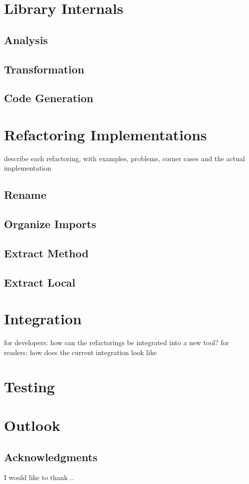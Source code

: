 \documentclass[10pt,a4paper,oneside]{scrreprt}
\begin{document}
\chapter{Library Internals}
\section{Analysis}
\section{Transformation}
\section{Code Generation}


\chapter{Refactoring Implementations}

describe each refactoring, with examples, problems, corner cases and the actual implementation

\section{Rename}
\section{Organize Imports}
\section{Extract Method}
\section{Extract Local}


\chapter{Integration}

for developers: how can the refactorings be integrated into a new tool?
for readers: how does the current integration look like

\chapter{Testing}


\chapter{Outlook}

\section{Acknowledgments}


I would like to thank ..
\appendix



\clearpage
\bib
\end{document}
